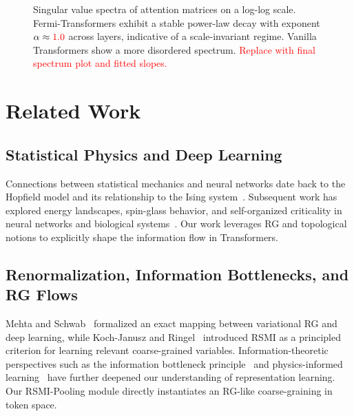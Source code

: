 \documentclass{article}
\newcommand{\TODO}[1]{\textcolor{red}{#1}}
\begin{document}
\begin{figure}[t]
    \centering
    \fbox{%
        \begin{minipage}[c][0.35\linewidth][c]{0.9\linewidth}
            \centering
            \TODO{Spectral plot placeholder}
        \end{minipage}
    }
    \caption{
    Singular value spectra of attention matrices on a log-log scale.
    Fermi-Transformers exhibit a stable power-law decay with exponent $\alpha \approx \TODO{1.0}$ across layers, indicative of a scale-invariant regime. Vanilla Transformers show a more disordered spectrum.
    \TODO{Replace with final spectrum plot and fitted slopes.}
    }
    \label{fig:spectrum}
\end{figure}

\section{Related Work}

\subsection{Statistical Physics and Deep Learning}

Connections between statistical mechanics and neural networks date back to the Hopfield model and its relationship to the Ising system~\cite{hopfield1982neural}. Subsequent work has explored energy landscapes, spin-glass behavior, and self-organized criticality in neural networks and biological systems~\cite{parisi1980order,bak1987self,chialvo2010emergent,biroli2024energy,zimmern2024large}. Our work leverages RG and topological notions to explicitly shape the information flow in Transformers.

\subsection{Renormalization, Information Bottlenecks, and RG Flows}

Mehta and Schwab~\cite{mehta2014exact} formalized an exact mapping between variational RG and deep learning, while Koch-Janusz and Ringel~\cite{koch2018mutual} introduced RSMI as a principled criterion for learning relevant coarse-grained variables. Information-theoretic perspectives such as the information bottleneck principle~\cite{tishby2015deep} and physics-informed learning~\cite{lin2017why,raissi2019physics,merchant2023scaling} have further deepened our understanding of representation learning. Our RSMI-Pooling module directly instantiates an RG-like coarse-graining in token space.
\end{document}
